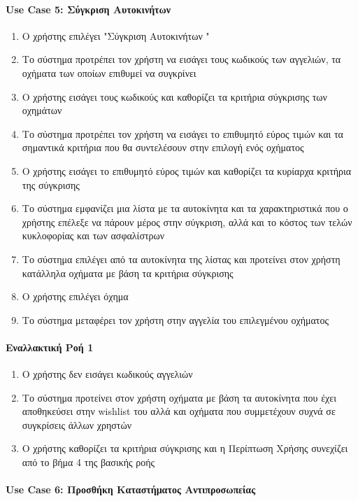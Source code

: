 \documentclass{../ol-softwaremanual}
\begin{document}
	\paragraph{\en Use Case 5: \gr Σύγκριση Αυτοκινήτων}
	\begin{enumerate}
		\item Ο χρήστης επιλέγει \en"\gr Σύγκριση Αυτοκινήτων \en"\gr 
		\item Το σύστημα προτρέπει τον χρήστη να εισάγει τους κωδικούς των αγγελιών, τα οχήματα των οποίων επιθυμεί να συγκρίνει
		\item Ο χρήστης εισάγει τους κωδικούς και καθορίζει τα κριτήρια σύγκρισης των οχημάτων
		\item Το σύστημα προτρέπει τον χρήστη να εισάγει το επιθυμητό εύρος τιμών και τα σημαντικά κριτήρια που θα συντελέσουν στην επιλογή ενός οχήματος
		\item Ο χρήστης εισάγει το επιθυμητό εύρος τιμών και καθορίζει τα κυρίαρχα κριτήρια της σύγκρισης
		\item Το σύστημα εμφανίζει μια λίστα με τα αυτοκίνητα και τα χαρακτηριστικά που ο χρήστης επέλεξε να πάρουν μέρος στην σύγκριση, αλλά και το κόστος των τελών κυκλοφορίας και των ασφαλίστρων
		\item Το σύστημα επιλέγει από τα αυτοκίνητα της λίστας και προτείνει στον χρήστη κατάλληλα οχήματα με βάση τα κριτήρια σύγκρισης
		\item Ο χρήστης επιλέγει όχημα 
		\item Το σύστημα μεταφέρει τον χρήστη στην αγγελία του επιλεγμένου οχήματος
	\end{enumerate}
	
	\paragraph{Εναλλακτική Ροή 1}
	
	\begin{enumerate}
		\item Ο χρήστης δεν εισάγει κωδικούς αγγελιών
		\item Το σύστημα προτείνει στον χρήστη οχήματα με βάση τα αυτοκίνητα που έχει αποθηκεύσει στην \en wishlist \gr του αλλά και οχήματα που συμμετέχουν συχνά σε συγκρίσεις άλλων χρηστών
		\item Ο χρήστης καθορίζει τα κριτήρια σύγκρισης και η Περίπτωση Χρήσης συνεχίζει από το βήμα 4 της βασικής ροής
	\end{enumerate}

	\paragraph{\en Use Case 6: \gr Προσθήκη Καταστήματος Αντιπροσωπείας}
	
\end{document}
